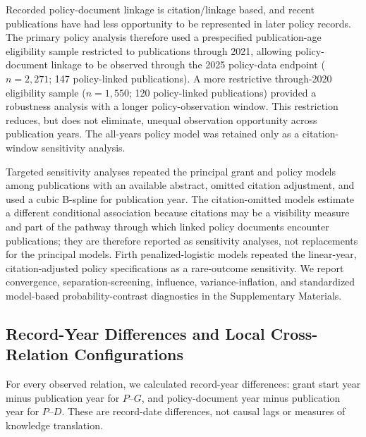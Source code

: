 \documentclass[12pt]{article}
\begin{document}
Recorded policy-document linkage is citation/linkage based, and recent publications have had less opportunity to be represented in later policy records. The primary policy analysis therefore used a prespecified publication-age eligibility sample restricted to publications through 2021, allowing policy-document linkage to be observed through the 2025 policy-data endpoint ($n=2,271$; 147 policy-linked publications). A more restrictive through-2020 eligibility sample ($n=1,550$; 120 policy-linked publications) provided a robustness analysis with a longer policy-observation window. This restriction reduces, but does not eliminate, unequal observation opportunity across publication years. The all-years policy model was retained only as a citation-window sensitivity analysis.

Targeted sensitivity analyses repeated the principal grant and policy models among publications with an available abstract, omitted citation adjustment, and used a cubic B-spline for publication year. The citation-omitted models estimate a different conditional association because citations may be a visibility measure and part of the pathway through which linked policy documents encounter publications; they are therefore reported as sensitivity analyses, not replacements for the principal models. Firth penalized-logistic models repeated the linear-year, citation-adjusted policy specifications as a rare-outcome sensitivity. We report convergence, separation-screening, influence, variance-inflation, and standardized model-based probability-contrast diagnostics in the Supplementary Materials.

\subsection{Record-Year Differences and Local Cross-Relation Configurations}

For every observed relation, we calculated record-year differences: grant start year minus publication year for $P$--$G$, and policy-document year minus publication year for $P$--$D$. These are record-date differences, not causal lags or measures of knowledge translation.
\end{document}
